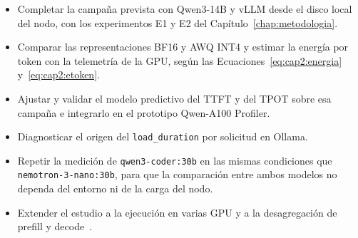 \begin{itemize}
  \item Completar la campaña prevista con Qwen3-14B y vLLM desde el disco local del nodo, con los experimentos E1 y E2 del Capítulo~\ref{chap:metodologia}.
  \item Comparar las representaciones BF16 y AWQ INT4 y estimar la energía por token con la telemetría de la GPU, según las Ecuaciones~\ref{eq:cap2:energia} y~\ref{eq:cap2:etoken}.
  \item Ajustar y validar el modelo predictivo del TTFT y del TPOT sobre esa campaña e integrarlo en el prototipo Qwen-A100 Profiler.
  \item Diagnosticar el origen del \texttt{load\_duration} por solicitud en Ollama.
  \item Repetir la medición de \texttt{qwen3-\allowbreak coder:\allowbreak 30b} en las mismas condiciones que \texttt{nemotron-3-\allowbreak nano:\allowbreak 30b}, para que la comparación entre ambos modelos no dependa del entorno ni de la carga del nodo.
  \item Extender el estudio a la ejecución en varias GPU y a la desagregación de prefill y decode~\cite{zhong2024distserve,patel2024splitwise}.
\end{itemize}
